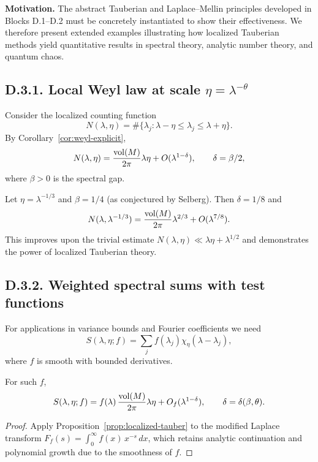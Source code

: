 \noindent \textbf{Motivation.}  
The abstract Tauberian and Laplace--Mellin principles developed in Blocks D.1--D.2 must be concretely instantiated to show their effectiveness.  
We therefore present extended examples illustrating how localized Tauberian methods yield quantitative results in spectral theory, analytic number theory, and quantum chaos.

\medskip

\subsection*{D.3.1. Local Weyl law at scale $\eta=\lambda^{-\theta}$}

Consider the localized counting function
\[
N(\lambda,\eta) = \#\{\lambda_j : \lambda-\eta \le \lambda_j \le \lambda+\eta\}.
\]
By Corollary~\ref{cor:weyl-explicit},
\[
N(\lambda,\eta) = \frac{\operatorname{vol}(M)}{2\pi}\lambda \eta + O(\lambda^{1-\delta}),
\qquad \delta = \beta/2,
\]
where $\beta>0$ is the spectral gap.  

\begin{example}
Let $\eta=\lambda^{-1/3}$ and $\beta=1/4$ (as conjectured by Selberg).  
Then $\delta=1/8$ and
\[
N(\lambda,\lambda^{-1/3}) = \frac{\operatorname{vol}(M)}{2\pi}\lambda^{2/3} + O(\lambda^{7/8}).
\]
This improves upon the trivial estimate $N(\lambda,\eta)\ll \lambda\eta+\lambda^{1/2}$ and demonstrates the power of localized Tauberian theory.  
\end{example}

\medskip

\subsection*{D.3.2. Weighted spectral sums with test functions}

For applications in variance bounds and Fourier coefficients we need
\[
S(\lambda,\eta;f) = \sum_j f(\lambda_j) \chi_\eta(\lambda-\lambda_j),
\]
where $f$ is smooth with bounded derivatives.  

\begin{proposition}\label{prop:weighted-sum}
For such $f$,
\[
S(\lambda,\eta;f) = f(\lambda)\,\frac{\operatorname{vol}(M)}{2\pi}\lambda\eta + O_f(\lambda^{1-\delta}),
\qquad \delta = \delta(\beta,\theta).
\]
\end{proposition}

\begin{proof}
Apply Proposition~\ref{prop:localized-tauber} to the modified Laplace transform
$F_f(s) = \int_0^\infty f(x)\,x^{-s}\,dx$, which retains analytic continuation and polynomial growth due to the smoothness of $f$.  
\end{proof}

